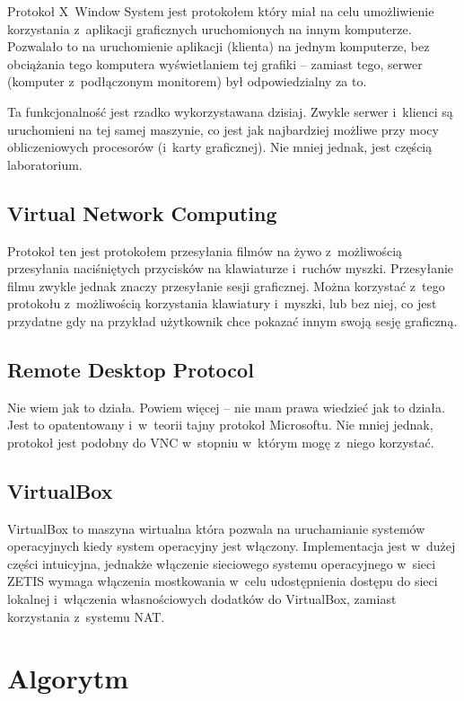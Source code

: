 \documentclass[a4paper,11pt]{article}
\begin{document}
Protokoł X~Window System jest protokołem który miał na celu umożliwienie
korzystania z~aplikacji graficznych uruchomionych na innym komputerze.
Pozwalało to na uruchomienie aplikacji (klienta) na jednym komputerze,
bez obciążania tego komputera wyświetlaniem tej grafiki -- zamiast tego,
serwer (komputer z~podłączonym monitorem) był odpowiedzialny za to.

Ta funkcjonalność jest rzadko wykorzystawana dzisiaj. Zwykle serwer
i~klienci są uruchomieni na tej samej maszynie, co jest jak najbardziej
możliwe przy mocy obliczeniowych procesorów (i~karty graficznej). Nie
mniej jednak, jest częścią laboratorium.

\subsection{Virtual Network Computing}

Protokoł ten jest protokołem przesyłania filmów na żywo z~możliwością
przesyłania naciśniętych przycisków na klawiaturze i~ruchów myszki.
Przesyłanie filmu zwykle jednak znaczy przesyłanie sesji graficznej.
Można korzystać z~tego protokołu z~możliwością korzystania klawiatury
i~myszki, lub bez niej, co jest przydatne gdy na przykład użytkownik
chce pokazać innym swoją sesję graficzną.

\subsection{Remote Desktop Protocol}

Nie wiem jak to działa. Powiem więcej -- nie mam prawa wiedzieć jak to działa.
Jest to opatentowany i~w~teorii tajny protokoł Microsoftu. Nie mniej jednak,
protokoł jest podobny do VNC w~stopniu w~którym mogę z~niego korzystać.

\subsection{VirtualBox}

VirtualBox to maszyna wirtualna która pozwala na uruchamianie systemów
operacyjnych kiedy system operacyjny jest włączony. Implementacja jest
w~dużej części intuicyjna, jednakże włączenie sieciowego systemu operacyjnego
w~sieci ZETIS wymaga włączenia mostkowania w~celu udostępnienia dostępu
do sieci lokalnej i~włączenia własnościowych dodatków do VirtualBox,
zamiast korzystania z~systemu NAT.

\section{Algorytm}
\end{document}
